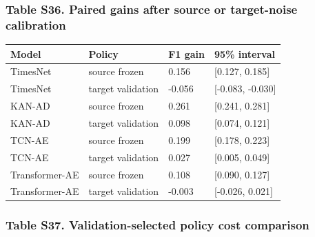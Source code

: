 \documentclass[a4paper,11pt]{article}
\newcounter{none}
\begin{document}
\subsubsection{Table S36. Paired gains after source or target-noise calibration}\label{table-s36.-paired-gains-after-source-or-target-noise-calibration}

{\def\LTcaptype{none} %
\begin{longtable}[]{@{}llll@{}}
\toprule\noalign{}
Model & Policy & F1 gain & 95\% interval \\
\midrule\noalign{}
\endhead
\bottomrule\noalign{}
\endlastfoot
TimesNet & source frozen & 0.156 & {[}0.127, 0.185{]} \\
TimesNet & target validation & -0.056 & {[}-0.083, -0.030{]} \\
KAN-AD & source frozen & 0.261 & {[}0.241, 0.281{]} \\
KAN-AD & target validation & 0.098 & {[}0.074, 0.121{]} \\
TCN-AE & source frozen & 0.199 & {[}0.178, 0.223{]} \\
TCN-AE & target validation & 0.027 & {[}0.005, 0.049{]} \\
Transformer-AE & source frozen & 0.108 & {[}0.090, 0.127{]} \\
Transformer-AE & target validation & -0.003 & {[}-0.026, 0.021{]} \\
\end{longtable}
}

\subsubsection{Table S37. Validation-selected policy cost comparison}\label{table-s37.-validation-selected-policy-cost-comparison}
\end{document}
